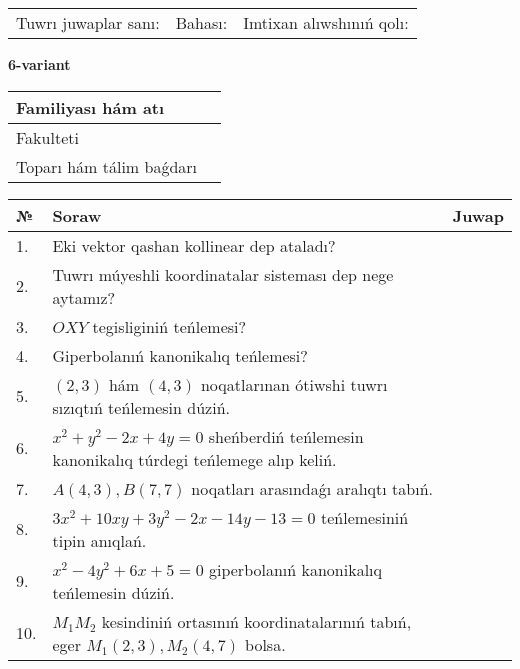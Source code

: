 \documentclass{article}
\begin{document}
\vspace{1cm}

\begin{tabular}{lll}
Tuwrı juwaplar sanı: \underline{\hspace{1.5cm}} & 
Bahası: \underline{\hspace{1.5cm}} & 
Imtixan alıwshınıń qolı: \underline{\hspace{2cm}} \\
\end{tabular}

\egroup

\newpage


\textbf{6-variant}\\

\bgroup
\def\arraystretch{1.6} %

\begin{tabular}{|m{5.7cm}|m{9.5cm}|}
\hline
Familiyası hám atı & \\
\hline
Fakulteti  & \\
\hline
Toparı hám tálim baǵdarı  & \\
\hline
\end{tabular}

\vspace{1cm}

\begin{tabular}{|m{0.7cm}|m{10cm}|m{4cm}|}
\hline
№ & Soraw & Juwap \\
\hline
1. & Eki vektor qashan kollinear dep ataladı? &  \\
\hline
2. & Tuwrı múyeshli koordinatalar sisteması dep nege aytamız? &  \\
\hline
3. & $OXY$ tegisliginiń teńlemesi? &  \\
\hline
4. & Giperbolanıń kanonikalıq teńlemesi? &  \\
\hline
5. & $(2, 3)$ hám $(4, 3)$ noqatlarınan ótiwshi tuwrı sızıqtıń teńlemesin dúziń. &  \\
\hline
6. & $x^{2}+y^{2}-2x+4y=0$ sheńberdiń teńlemesin kanonikalıq túrdegi teńlemege alıp keliń. &  \\
\hline
7. & $A(4, 3), B(7, 7)$ noqatları arasındaǵı aralıqtı tabıń. &  \\
\hline
8. & $3x^{2}+10xy+3y^{2}-2x-14y-13=0$ teńlemesiniń tipin anıqlań. &  \\
\hline
9. & $x^{2}-4y^{2}+6x+5=0$ giperbolanıń kanonikalıq teńlemesin dúziń. &  \\
\hline
10. & $M_{1}M_{2}$ kesindiniń ortasınıń koordinatalarınıń tabıń, eger $M_{1} (2, 3), M_{2} (4, 7)$ bolsa. &  \\
\hline
\end{tabular}
\end{document}
